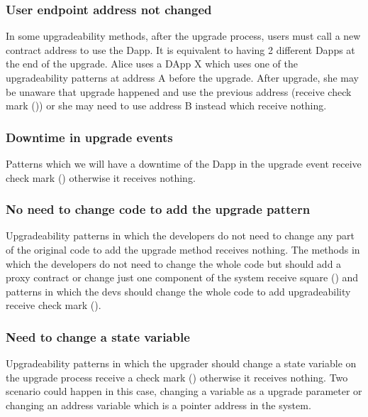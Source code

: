 \subsubsection{User endpoint address not changed}
In some upgradeability methods, after the upgrade process, users must call a new contract address to use the Dapp. It is equivalent to having 2 different Dapps at the  end of the upgrade. Alice uses a DApp X which uses one of the upgradeability patterns at address A before the upgrade. After upgrade, she may be unaware that upgrade happened and use the previous address (receive check mark (\checkmark)) or she may need to use address B instead which receive nothing.


\subsubsection{Downtime in upgrade events}
Patterns which we will have a downtime of the Dapp in the upgrade event receive check mark (\checkmark) otherwise it receives nothing. 


\subsubsection{No need to change code to add the upgrade pattern}
Upgradeability patterns in which the developers do not need to change any part of the original code to add the upgrade method receives nothing. The methods in which the developers do not need to change the whole code but should add a proxy contract or change just one component of the system receive square (\XBox) and patterns in which the devs should change the whole code to add upgradeability receive check mark (\checkmark).

\subsubsection{Need to change a state variable}
Upgradeability patterns in which the upgrader should change a state variable on the upgrade process receive a check mark (\checkmark) otherwise it receives nothing. Two scenario could happen in this case, changing a variable as a upgrade parameter or changing an address variable which is a pointer address in the system. 


